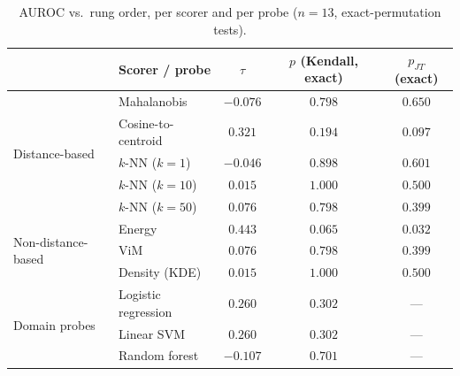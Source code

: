 \begin{table}[htbp]
\centering
\caption{AUROC vs.\ rung order, per scorer and per probe ($n=13$, exact-permutation tests).}
\label{tab:s7-scorer-probe-stats}
\small
\begin{tabular}{llccc}
\toprule
& Scorer / probe & $\tau$ & $p$ (Kendall, exact) & $p_{JT}$ (exact) \\
\midrule
\multirow{5}{*}{Distance-based}
& Mahalanobis        & $-0.076$ & $0.798$ & $0.650$ \\
& Cosine-to-centroid & $0.321$  & $0.194$ & $0.097$ \\
& $k$-NN ($k=1$)     & $-0.046$ & $0.898$ & $0.601$ \\
& $k$-NN ($k=10$)    & $0.015$  & $1.000$ & $0.500$ \\
& $k$-NN ($k=50$)    & $0.076$  & $0.798$ & $0.399$ \\
\midrule
\multirow{3}{*}{Non-distance-based}
& Energy             & $0.443$  & $0.065$ & $0.032$ \\
& ViM                & $0.076$  & $0.798$ & $0.399$ \\
& Density (KDE)      & $0.015$  & $1.000$ & $0.500$ \\
\midrule
\multirow{3}{*}{Domain probes}
& Logistic regression & $0.260$  & $0.302$ & --- \\
& Linear SVM          & $0.260$  & $0.302$ & --- \\
& Random forest       & $-0.107$ & $0.701$ & --- \\
\bottomrule
\end{tabular}
\end{table}
